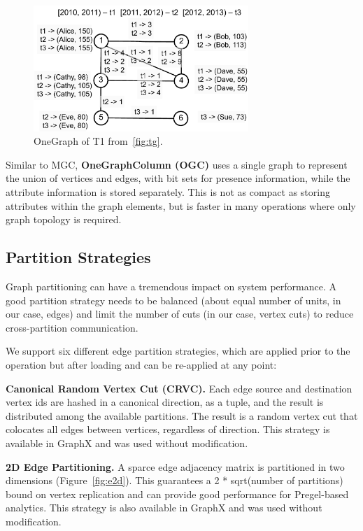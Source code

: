 \begin{figure}[t!]
\includegraphics[width=3.2in]{figs/og.pdf}
\caption{OneGraph of T1 from~\ref{fig:tg}.}
\label{fig:og}
\end{figure}

Similar to MGC, {\bf OneGraphColumn (OGC)} uses a single graph to
represent the union of vertices and edges, with bit sets for presence
information, while the attribute information is stored separately.
This is not as compact as storing attributes within the graph
elements, but is faster in many operations where only graph topology
is required.

\subsection{Partition Strategies}  
\label{sec:sys:partition}

Graph partitioning can have a tremendous impact on system performance.
A good partition strategy needs to be balanced (about equal number of
units, in our case, edges) and limit the number of cuts (in our case,
vertex cuts) to reduce cross-partition communication.

We support six different edge partition strategies, which are applied
prior to the operation but after loading and can be re-applied at any
point:

{\bf Canonical Random Vertex Cut (CRVC).}  Each edge source and
destination vertex ids are hashed in a canonical direction, as a
tuple, and the result is distributed among the available partitions.
The result is a random vertex cut that colocates all edges between
vertices, regardless of direction.  This strategy is available in
GraphX and was used without modification.

{\bf 2D Edge Partitioning.}  A sparce edge adjacency matrix is
partitioned in two dimensions (Figure~\ref{fig:e2d}).  This guarantees
a 2 * sqrt(number of partitions) bound on vertex replication and can
provide good performance for Pregel-based analytics.  This strategy is
also available in GraphX and was used without modification.

